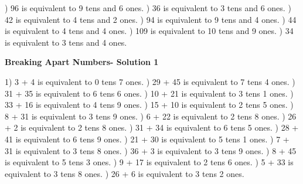 \documentclass{article}%
\begin{document}
) 96 is equivalent to  9 tens and 6 ones.%
) 36 is equivalent to  3 tens and 6 ones.%
) 42 is equivalent to  4 tens and 2 ones.%
) 94 is equivalent to  9 tens and 4 ones.%
) 44 is equivalent to  4 tens and 4 ones.%
) 109 is equivalent to  10 tens and 9 ones.%
) 34 is equivalent to  3 tens and 4 ones.%
\newline%
\newpage%
\large%
\begin{center}%
\textbf{Breaking Apart Numbers- Solution 1}%
\newline%
\end{center} \normalsize%
1) 3 + 4 is equivalent to 0 tens 7 ones.%
) 29 + 45 is equivalent to 7 tens 4 ones.%
) 31 + 35 is equivalent to 6 tens 6 ones.%
) 10 + 21 is equivalent to 3 tens 1 ones.%
) 33 + 16 is equivalent to 4 tens 9 ones.%
) 15 + 10 is equivalent to 2 tens 5 ones.%
) 8 + 31 is equivalent to 3 tens 9 ones.%
) 6 + 22 is equivalent to 2 tens 8 ones.%
) 26 + 2 is equivalent to 2 tens 8 ones.%
) 31 + 34 is equivalent to 6 tens 5 ones.%
) 28 + 41 is equivalent to 6 tens 9 ones.%
) 21 + 30 is equivalent to 5 tens 1 ones.%
) 7 + 31 is equivalent to 3 tens 8 ones.%
) 36 + 3 is equivalent to 3 tens 9 ones.%
) 8 + 45 is equivalent to 5 tens 3 ones.%
) 9 + 17 is equivalent to 2 tens 6 ones.%
) 5 + 33 is equivalent to 3 tens 8 ones.%
) 26 + 6 is equivalent to 3 tens 2 ones.%
\newline%
\end{document}
